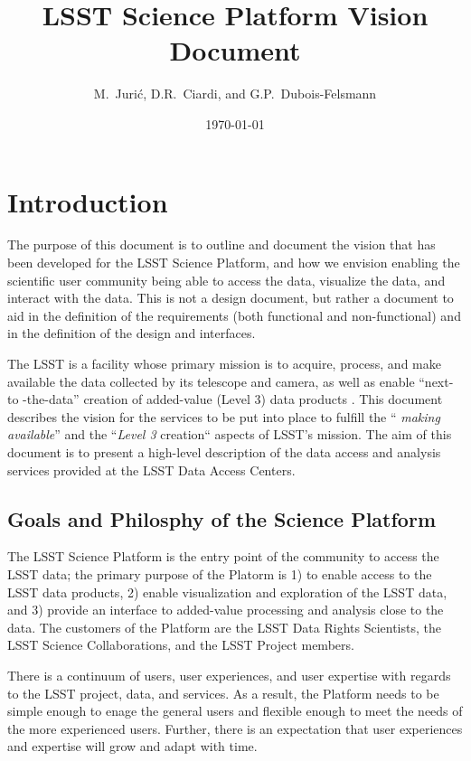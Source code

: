 \documentclass[DM,lsstdraft,toc]{lsstdoc}
\title[LSST Science Platform]{LSST Science Platform Vision Document}
\author{
M.~Juri\'c,
D.R.~Ciardi,
and
G.P.~Dubois-Felsmann
}
\date{\today}
\begin{document}
\maketitle

\section{Introduction}
The purpose of this document is to outline and document the vision that has been 
developed for the LSST Science Platform, and how we envision enabling the 
scientific user community being able to access the data, visualize the data, and 
interact with the data.   This is not a design document, but rather a document 
to aid in the definition of the requirements (both functional and 
non-functional) and in the definition of the design and interfaces.

The LSST is a facility whose primary mission is to acquire, process, and make 
available the data collected by its telescope and camera, as well as enable 
``next-to -the-data'' creation of added-value (Level 3) data products 
\cite{SRD}.  This document describes the vision for the services to be put into 
place to fulfill the `` {\em making available}'' and the ``{\em Level 3} 
creation`` aspects of LSST's mission. The aim of this document is to present a 
high-level description of the data access and analysis services provided at the 
LSST Data Access Centers.

\subsection{Goals and Philosphy of the Science Platform}

The LSST Science Platform is the entry point of the community to access the LSST 
data; the primary purpose of the Platorm is 1) to enable access to the LSST data 
products, 2) enable visualization and exploration of the LSST data, and 3) 
provide an interface to added-value processing and analysis close to the data.  
The customers of the Platform are the LSST Data Rights Scientists, the LSST 
Science Collaborations, and the LSST Project members.  

There is a continuum of users, user experiences, and user expertise with regards 
to the LSST project, data, and services.  As a result, the Platform needs to be 
simple enough to enage the general users and flexible enough to meet the needs 
of the more experienced users. Further, there is an expectation that user 
experiences and expertise will grow and adapt with time. 
\end{document}
